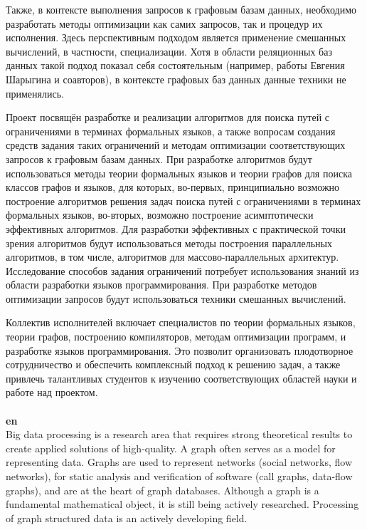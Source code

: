 \documentclass[12pt]{article}  %
\theoremstyle{remark}
\begin{document}
Также, в контексте выполнения запросов к графовым базам данных, необходимо разработать методы оптимизации как самих запросов, так и процедур их исполнения. Здесь перспективным подходом является применение смешанных вычислений, в частности, специализации. Хотя в области реляционных баз данных такой подход показал себя состоятельным (например, работы Евгения Шарыгина и соавторов), в контексте графовых баз данных данные техники не применялись.

Проект посвящён разработке и реализации алгоритмов для поиска путей с ограничениями в терминах формальных языков, а также вопросам создания средств задания таких ограничений и методам оптимизации соответствующих запросов к графовым базам данных. При разработке алгоритмов будут использоваться методы теории формальных языков и теории графов для поиска классов графов и языков, для которых, во-первых, принципиально возможно построение алгоритмов решения задач поиска путей с ограничениями в терминах формальных языков, во-вторых,  возможно построение асимптотически эффективных алгоритмов. Для разработки эффективных с практической точки зрения алгоритмов будут использоваться методы построения параллельных алгоритмов, в том числе, алгоритмов для массово-параллельных архитектур. Исследование способов задания ограничений потребует использования знаний из области разработки языков программирования. При разработке методов оптимизации запросов будут использоваться техники смешанных вычислений.

Коллектив исполнителей включает специалистов по теории формальных языков, теории графов, построению компиляторов, методам оптимизации программ, и разработке языков программирования. Это позволит организовать плодотворное сотрудничество и обеспечить комплексный подход к решению задач, а также привлечь талантливых студентов к изучению соответствующих областей науки и работе над проектом.
\\
\\
\textbf{en}\\

Big data processing is a research area that requires strong theoretical results to create applied solutions of high-quality. A graph often serves as a model for representing data. Graphs are used to represent networks (social networks, flow networks), for static analysis and verification of software (call graphs, data-flow graphs), and are at the heart of graph databases. Although a graph is a fundamental mathematical object, it is still being actively researched. Processing of graph structured data is an actively developing field.
\end{document}
